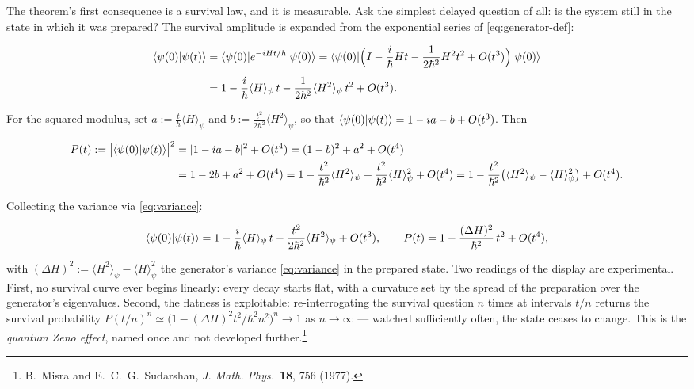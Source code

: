 The theorem's first consequence is a survival law, and it is measurable. Ask the simplest delayed question of all: is the system still in the state in which it was prepared? The survival amplitude is expanded from the exponential series of \eqref{eq:generator-def}:
\begin{linenomath}
    \begin{equation*}
        \begin{aligned}
            \braket{\psi(0)|\psi(t)}
            &= \braket{\psi(0)|e^{-iHt/\hbar}|\psi(0)}
             = \braket{\psi(0)|\Bigl(I - \frac{i}{\hbar}Ht - \frac{1}{2\hbar^2}H^2t^2 + O(t^3)\Bigr)|\psi(0)} \\[4pt]
            &= 1 - \frac{i}{\hbar}\langle H\rangle_\psi\,t - \frac{1}{2\hbar^2}\langle H^2\rangle_\psi\,t^2 + O(t^3) .
        \end{aligned}
    \end{equation*}
\end{linenomath}
For the squared modulus, set $a := \frac{t}{\hbar}\langle H\rangle_\psi$ and $b := \frac{t^2}{2\hbar^2}\langle H^2\rangle_\psi$, so that $\braket{\psi(0)|\psi(t)} = 1 - ia - b + O(t^3)$. Then
\begin{linenomath}
    \begin{equation*}
        \begin{aligned}
            P(t) := \bigl|\braket{\psi(0)|\psi(t)}\bigr|^2
            &= |1 - ia - b|^2 + O(t^4)
             = (1 - b)^2 + a^2 + O(t^4) \\
            &= 1 - 2b + a^2 + O(t^4)
             = 1 - \frac{t^2}{\hbar^2}\langle H^2\rangle_\psi + \frac{t^2}{\hbar^2}\langle H\rangle_\psi^2 + O(t^4)
             = 1 - \frac{t^2}{\hbar^2}\bigl(\langle H^2\rangle_\psi - \langle H\rangle_\psi^2\bigr) + O(t^4) .
        \end{aligned}
    \end{equation*}
\end{linenomath}
Collecting the variance via \eqref{eq:variance}:
\begin{linenomath}
    \begin{equation}
        \braket{\psi(0)|\psi(t)} = 1 - \frac{i}{\hbar}\langle H\rangle_\psi\,t - \frac{t^2}{2\hbar^2}\langle H^2\rangle_\psi + O(t^3), \qquad P(t) = 1 - \frac{(\Delta H)^2}{\hbar^2}\,t^2 + O(t^4),
        \label{eq:quadratic-survival}
    \end{equation}
\end{linenomath}
with $(\Delta H)^2 := \langle H^2\rangle_\psi - \langle H\rangle_\psi^2$ the generator's variance \eqref{eq:variance} in the prepared state. Two readings of the display are experimental. First, no survival curve ever begins linearly: every decay starts flat, with a curvature set by the spread of the preparation over the generator's eigenvalues. Second, the flatness is exploitable: re-interrogating the survival question $n$ times at intervals $t/n$ returns the survival probability $P(t/n)^n \simeq \bigl(1 - (\Delta H)^2 t^2/\hbar^2 n^2\bigr)^n \longrightarrow 1$ as $n \to \infty$ --- watched sufficiently often, the state ceases to change. This is the \emph{quantum Zeno effect}, named once and not developed further.\footnote{B.~Misra and E.~C.~G.~Sudarshan, \emph{J. Math. Phys.}~\textbf{18}, 756 (1977).}

